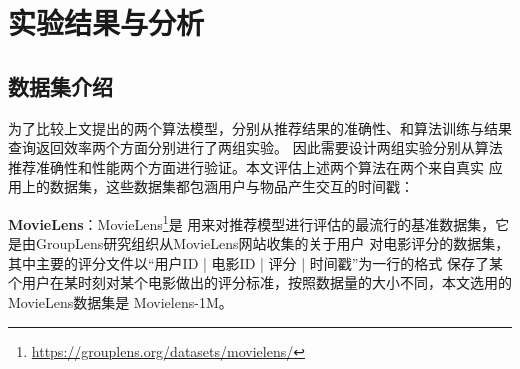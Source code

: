 ﻿%
\chapter{实验结果与分析}

\section{数据集介绍}

为了比较上文提出的两个算法模型，分别从推荐结果的准确性、和算法训练与结果查询返回效率两个方面分别进行了两组实验。%
因此需要设计两组实验分别从算法推荐准确性和性能两个方面进行验证。本文评估上述两个算法在两个来自真实%
应用上的数据集，这些数据集都包涵用户与物品产生交互的时间戳：

\textbf{MovieLens}：MovieLens\footnote{\url{https://grouplens.org/datasets/movielens/}}是%
用来对推荐模型进行评估的最流行的基准数据集，它是由GroupLens研究组织从MovieLens网站收集的关于用户%
对电影评分的数据集，其中主要的评分文件以“用户ID | 电影ID | 评分 | 时间戳”为一行的格式%
保存了某个用户在某时刻对某个电影做出的评分标准，按照数据量的大小不同，本文选用的MovieLens数据集是%
Movielens-1M。

